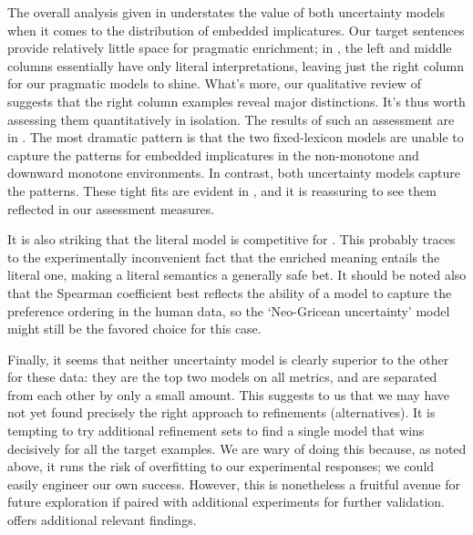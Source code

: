 \documentclass[leqno,12pt]{article}
\begin{document}
The overall analysis given in  understates the
value of both uncertainty models when it comes to the distribution of
embedded implicatures. Our target sentences provide relatively little
space for pragmatic enrichment; in , the left
and middle columns essentially have only literal interpretations,
leaving just the right column for our pragmatic models to
shine. What's more, our qualitative review of
 suggests that the right column examples
reveal major distinctions. It's thus worth assessing them
quantitatively in isolation. The results of such an assessment are in
.  The most dramatic pattern is that the two
fixed-lexicon models are unable to capture the patterns for embedded
implicatures in the non-monotone and downward monotone
environments. In contrast, both uncertainty models capture the
patterns. These tight fits are evident in ,
and it is reassuring to see them reflected in our assessment measures.

It is also striking that the literal model is competitive for
. This probably traces to the experimentally
inconvenient fact that the enriched meaning entails the literal one,
making a literal semantics a generally safe bet. It should be noted
also that the Spearman coefficient best reflects the ability of a
model to capture the preference ordering in the human data, so the
`Neo-Gricean uncertainty' model might still be the favored choice for
this case.

Finally, it seems that neither uncertainty model is clearly superior
to the other for these data: they are the top two models on all
metrics, and are separated from each other by only a small amount.
This suggests to us that we may have not yet found precisely the right
approach to refinements (alternatives). It is tempting to try
additional refinement sets to find a single model that wins decisively
for all the target examples. We are wary of doing this because, as
noted above, it runs the risk of overfitting to our experimental
responses; we could easily engineer our own success.  However, this is
nonetheless a fruitful avenue for future exploration if paired with
additional experiments for further
validation.  offers additional relevant findings.
\end{document}

